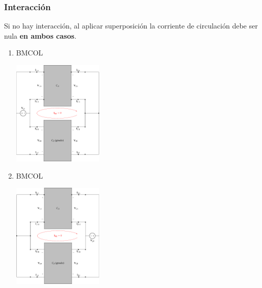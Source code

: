 \subsubsection{Interacción}
\label{sec:orgf1d8a5b}
Si no hay interacción, al aplicar superposición la corriente de circulación debe ser nula \textbf{en ambos casos}.
\begin{enumerate}
\item \hfill{}\textsc{BMCOL}
\label{sec:orgaa86e5c}

\includegraphics[height=5cm]{../figs/paralelo-paralelo-superposicion-entrada.pdf}

\item \hfill{}\textsc{BMCOL}
\label{sec:org5b95701}

\includegraphics[height=5cm]{../figs/paralelo-paralelo-superposicion-salida.pdf}

\end{enumerate}

